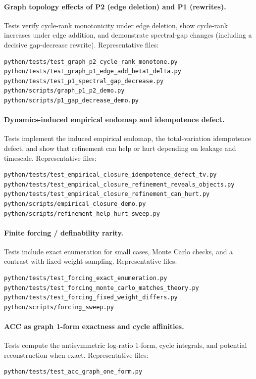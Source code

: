 \documentclass[11pt]{article}
\theoremstyle{remark}
\begin{document}
\paragraph{Graph topology effects of P2 (edge deletion) and P1 (rewrites).}
Tests verify cycle-rank monotonicity under edge deletion, show cycle-rank increases under edge addition,
and demonstrate spectral-gap changes (including a decisive gap-decrease rewrite).
Representative files:
\begin{verbatim}
python/tests/test_graph_p2_cycle_rank_monotone.py
python/tests/test_graph_p1_edge_add_beta1_delta.py
python/tests/test_p1_spectral_gap_decrease.py
python/scripts/graph_p1_p2_demo.py
python/scripts/p1_gap_decrease_demo.py
\end{verbatim}

\paragraph{Dynamics-induced empirical endomap and idempotence defect.}
Tests implement the induced empirical endomap, the total-variation idempotence defect, and show that
refinement can help or hurt depending on leakage and timescale.
Representative files:
\begin{verbatim}
python/tests/test_empirical_closure_idempotence_defect_tv.py
python/tests/test_empirical_closure_refinement_reveals_objects.py
python/tests/test_empirical_closure_refinement_can_hurt.py
python/scripts/empirical_closure_demo.py
python/scripts/refinement_help_hurt_sweep.py
\end{verbatim}

\paragraph{Finite forcing / definability rarity.}
Tests include exact enumeration for small cases, Monte Carlo checks, and a contrast with fixed-weight sampling.
Representative files:
\begin{verbatim}
python/tests/test_forcing_exact_enumeration.py
python/tests/test_forcing_monte_carlo_matches_theory.py
python/tests/test_forcing_fixed_weight_differs.py
python/scripts/forcing_sweep.py
\end{verbatim}

\paragraph{ACC as graph 1-form exactness and cycle affinities.}
Tests compute the antisymmetric log-ratio 1-form, cycle integrals, and potential reconstruction when exact.
Representative files:
\begin{verbatim}
python/tests/test_acc_graph_one_form.py
\end{verbatim}



\end{document}
